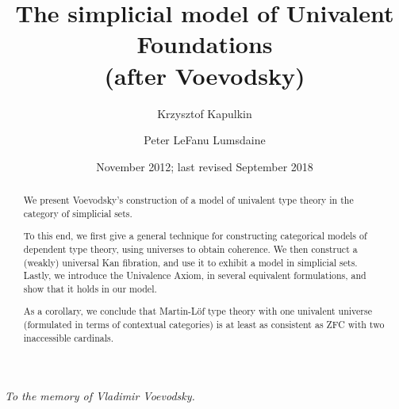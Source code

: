 \documentclass[11pt]{amsart}
\theoremstyle{plain}
\theoremstyle{definition}
\begin{document}
\title[The simplicial model of Univalent Foundations (after Voevodsky)]%
  {The simplicial model of Univalent Foundations \\ (after Voevodsky)}

\author[K. Kapulkin]{Krzysztof Kapulkin}
\address[Krzysztof Kapulkin]{University of Pittsburgh}

\author[P. LeF. Lumsdaine]{Peter LeFanu Lumsdaine}
\address[Peter LeFanu Lumsdaine]{Institute for Advanced Study, Princeton}


\date{November 2012; last revised September 2018}

\begin{abstract}
We present Voevodsky’s construction of a model of univalent type theory in the category of simplicial sets.

To this end, we first give a general technique for constructing categorical models of dependent type theory, using universes to obtain coherence.  We then construct a (weakly) universal Kan fibration, and use it to exhibit a model in simplicial sets.  Lastly, we introduce the Univalence Axiom, in several equivalent formulations, and show that it holds in our model.

As a corollary, we conclude that Martin-Löf type theory with one univalent universe (formulated in terms of contextual categories) is at least as consistent as ZFC with two inaccessible cardinals.
\end{abstract}

\maketitle

\begin{flushright}
\emph{To the memory of Vladimir Voevodsky.}
\end{flushright}

\tableofcontents

\clearpage









\appendix









\end{document}

